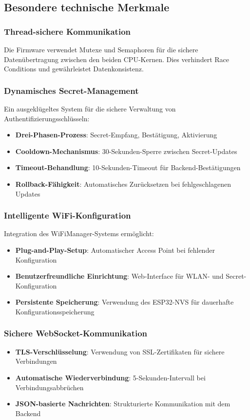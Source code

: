\subsection{Besondere technische Merkmale}

\subsubsection{Thread-sichere Kommunikation}
Die Firmware verwendet Mutexe und Semaphoren für die sichere Datenübertragung zwischen den beiden CPU-Kernen. Dies verhindert Race Conditions und gewährleistet Datenkonsistenz.

\subsubsection{Dynamisches Secret-Management}
Ein ausgeklügeltes System für die sichere Verwaltung von Authentifizierungsschlüsseln:

\begin{itemize}
\item \textbf{Drei-Phasen-Prozess}: Secret-Empfang, Bestätigung, Aktivierung
\item \textbf{Cooldown-Mechanismus}: 30-Sekunden-Sperre zwischen Secret-Updates
\item \textbf{Timeout-Behandlung}: 10-Sekunden-Timeout für Backend-Bestätigungen
\item \textbf{Rollback-Fähigkeit}: Automatisches Zurücksetzen bei fehlgeschlagenen Updates
\end{itemize}

\subsubsection{Intelligente WiFi-Konfiguration}
Integration des WiFiManager-Systems ermöglicht:

\begin{itemize}
\item \textbf{Plug-and-Play-Setup}: Automatischer Access Point bei fehlender Konfiguration
\item \textbf{Benutzerfreundliche Einrichtung}: Web-Interface für WLAN- und Secret-Konfiguration
\item \textbf{Persistente Speicherung}: Verwendung des ESP32-NVS für dauerhafte Konfigurationsspeicherung
\end{itemize}

\subsubsection{Sichere WebSocket-Kommunikation}
\begin{itemize}
\item \textbf{TLS-Verschlüsselung}: Verwendung von SSL-Zertifikaten für sichere Verbindungen
\item \textbf{Automatische Wiederverbindung}: 5-Sekunden-Intervall bei Verbindungsabbrüchen
\item \textbf{JSON-basierte Nachrichten}: Strukturierte Kommunikation mit dem Backend
\end{itemize}

